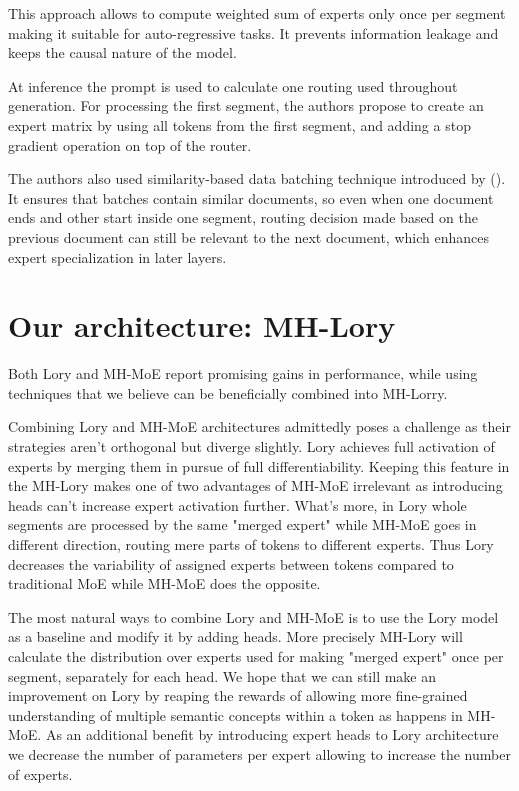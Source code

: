 \documentclass[12pt]{article}
\begin{document}
This approach allows to compute weighted sum of experts only once per segment making it suitable for auto-regressive tasks. It prevents information leakage and keeps the causal nature of the model.

At inference the prompt is used to calculate one routing used throughout generation. 
For processing the first segment, the authors propose to create an expert matrix by using all tokens from the first segment, and adding a stop gradient operation on top of the router.

The authors also used similarity-based data batching technique introduced by (\cite{shi2023context}). 
It ensures that batches contain similar documents, so even when one document ends and other start inside one segment, routing decision made based on the previous document can still be relevant to the next document, which enhances expert specialization in later layers.



\section{Our architecture: MH-Lory}
Both Lory and MH-MoE report promising gains in performance, while using techniques that we believe can be beneficially combined into MH-Lorry. 

Combining Lory and MH-MoE architectures admittedly poses a challenge as their strategies aren't orthogonal but diverge slightly. Lory achieves full activation of experts by merging them in pursue of full differentiability. Keeping this feature in the MH-Lory makes one of two advantages of MH-MoE irrelevant as introducing heads can't increase expert activation further. What's more, in Lory whole segments are processed by the same "merged expert" while MH-MoE goes in different direction, routing mere parts of tokens to different experts. Thus Lory decreases the variability of assigned experts between tokens compared to traditional MoE while MH-MoE does the opposite.

The most natural ways to combine Lory and MH-MoE is to use the Lory model as a baseline and modify it by adding heads. More precisely MH-Lory will calculate the distribution over experts used for making "merged expert" once per segment, separately for each head. We hope that we can still make an improvement on Lory by reaping the rewards of allowing more fine-grained understanding of multiple semantic concepts within a token as happens in MH-MoE. As an additional benefit by introducing expert heads to Lory architecture we decrease the number of parameters per expert allowing to increase the number of experts.
\end{document}
